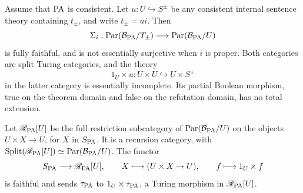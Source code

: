 \begin{corollary}
\label{cor:arithmetic-associated-categories}
Assume that $\mathrm{PA}$ is consistent. Let
$u:U\hookrightarrow S^{\pm}$ be any consistent internal sentence
theory containing $t_{\pm}$, and write $t_{\pm}=ui$.
Then
\[
 \Sigma_i:
 \operatorname{Par}(\mathcal B_{\mathrm{PA}}/T_{\pm})
 \longrightarrow
 \operatorname{Par}(\mathcal B_{\mathrm{PA}}/U)
\]
is fully faithful, and is not essentially surjective when $i$ is
proper. Both categories are split Turing categories, and the
theory
\[
 1_U\times u:U\times U\hookrightarrow U\times S^{\pm}
\]
in the latter category is essentially incomplete. Its partial
Boolean morphism, true on the theorem domain and false on the
refutation domain, has no total extension.

Let $\mathscr R_{\mathrm{PA}}[U]$ be the full restriction subcategory of
$\operatorname{Par}(\mathcal B_{\mathrm{PA}}/U)$ on the objects
$U\times X\to U$, for $X$ in $S_{\mathrm{PA}}$.
It is a recursion category, with
$\operatorname{Split}(\mathscr R_{\mathrm{PA}}[U])\simeq\operatorname{Par}(\mathcal B_{\mathrm{PA}}/U)$.
The functor
\[
 S_{\mathrm{PA}}\longrightarrow\mathscr R_{\mathrm{PA}}[U],\qquad
 X\longmapsto(U\times X\to U),\qquad
 f\longmapsto1_U\times f
\]
is faithful and sends $\tau_{\mathrm{PA}}$ to $1_U\times\tau_{\mathrm{PA}}$,
a Turing morphism in $\mathscr R_{\mathrm{PA}}[U]$.
\end{corollary}
